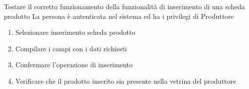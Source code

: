 
{Testare il corretto funzionamento della funzionalità di inserimento di una scheda prodotto}
{La persona è autenticata nel sistema ed ha i privilegi di Produttore}
{\begin{enumerate}
    \item Selezionare inserimento scheda prodotto
    \item Compilare i campi con i dati richiesti
    \item Confermare l'operazione di inserimento
    \item Verificare che il prodotto inserito sia presente nella vetrina del produttore
\end{enumerate}}


{}
{}
{}


{}
{}
{}


{}
{}
{}


{}
{}
{}


{}
{}
{}


{}
{}
{}


{}
{}
{}






